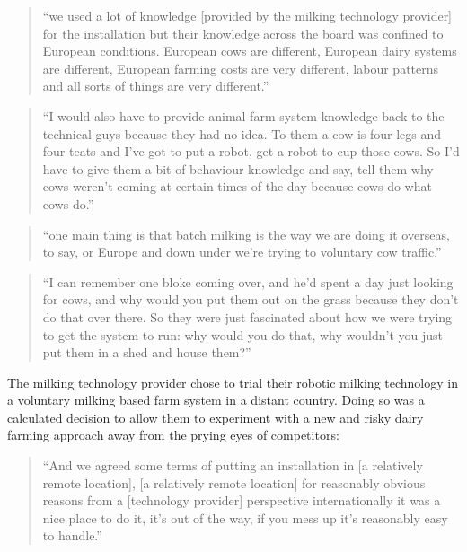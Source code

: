  \begin{quote}
\small
\enquote{we used a lot of knowledge [provided by the milking technology provider] for the installation but their knowledge across the board was confined to European conditions. European cows are different, European dairy systems are different, European farming costs are very different, labour patterns and all sorts of things are very different.} \\
\end{quote}

\begin{quote}
\small
\enquote{I would also have to provide animal farm system knowledge back to the technical guys because they had no idea. To them a cow is four legs and four teats and I've got to put a robot, get a robot to cup those cows.  So I'd have to give them a bit of behaviour knowledge and say, tell them why cows weren't coming at certain times of the day because cows do what cows do.} \\
\end{quote}

\begin{quote}
\small
\enquote{one main thing is that batch milking is the way we are doing it overseas, to say, or Europe and down under we’re trying to voluntary cow traffic.} \\
\end{quote}

\begin{quote}
\small
\enquote{I can remember one bloke coming over, and he'd spent a day just looking for cows, and why would you put them out on the grass because they don't do that over there. So they were just fascinated about how we were trying to get the system to run: why would you do that, why wouldn't you just put them in a shed and house them?} \\
\end{quote}

The milking technology provider chose to trial their robotic milking technology in a voluntary milking based farm system in a distant country. Doing so was a calculated decision to allow them to experiment with a new and risky dairy farming approach away from the prying eyes of competitors:

\begin{quote}
\small
\enquote{And we agreed some terms of putting an installation in [a relatively remote location], [a relatively remote location] for reasonably obvious reasons from a [technology provider] perspective internationally it was a nice place to do it, it's out of the way, if you mess up it's reasonably easy to handle.} \\
\end{quote}

